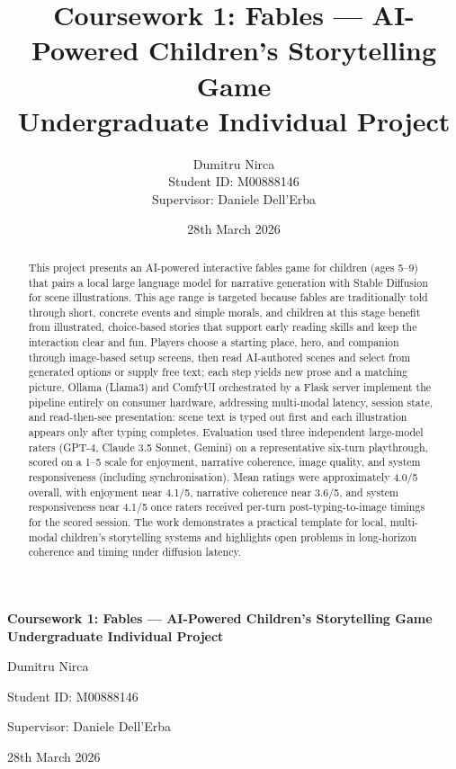 \documentclass[12pt,a4paper]{article}
\title{Coursework 1: Fables --- AI-Powered Children's Storytelling Game\\
    \large Undergraduate Individual Project}
\author{Dumitru Nirca\\
    Student ID: M00888146\\
    Supervisor: Daniele Dell'Erba}
\date{28th March 2026}
\begin{document}
    \begin{titlepage}
    \centering
    \vspace*{\fill}

{\Large\bfseries Coursework 1: Fables --- AI-Powered Children's Storytelling Game\\[0.5cm]
    \large Undergraduate Individual Project\par}

    \vspace{2cm}

    {\large Dumitru Nirca\par}
    \vspace{0.5cm}
    Student ID: M00888146\par
    \vspace{0.5cm}
    Supervisor: Daniele Dell'Erba\par

    \vspace{2cm}

28th March 2026

    \vspace*{\fill}
    \end{titlepage}

    \begin{abstract}
This project presents an AI-powered interactive fables game for children (ages 5--9) that pairs a local large language model for narrative generation with Stable Diffusion for scene illustrations. This age range is targeted because fables are traditionally told through short, concrete events and simple morals, and children at this stage benefit from illustrated, choice-based stories that support early reading skills and keep the interaction clear and fun. Players choose a starting place, hero, and companion through image-based setup screens, then read AI-authored scenes and select from generated options or supply free text; each step yields new prose and a matching picture. Ollama (Llama3) and ComfyUI orchestrated by a Flask server implement the pipeline entirely on consumer hardware, addressing multi-modal latency, session state, and read-then-see presentation: scene text is typed out first and each illustration appears only after typing completes. Evaluation used three independent large-model raters (GPT-4, Claude 3.5 Sonnet, Gemini) on a representative six-turn playthrough, scored on a 1--5 scale for enjoyment, narrative coherence, image quality, and system responsiveness (including synchronisation). Mean ratings were approximately 4.0/5 overall, with enjoyment near 4.1/5, narrative coherence near 3.6/5, and system responsiveness near 4.1/5 once raters received per-turn post-typing-to-image timings for the scored session. The work demonstrates a practical template for local, multi-modal children's storytelling systems and highlights open problems in long-horizon coherence and timing under diffusion latency.
    \end{abstract}
\end{document}
